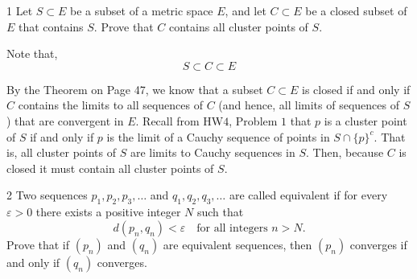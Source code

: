 \documentclass[12pt]{article}
\begin{document}


\begin{problem}{1}
Let $S \subset E$ be a subset of a metric space $E$, and let $C \subset E$ be a closed subset of $E$
that contains $S$. Prove that $C$ contains all cluster points of $S$.
\end{problem}

\begin{solution}
    \bbni

    Note that, 
    \[S \subset C \subset E\]

    By the Theorem on Page 47, we know that a subset $C \subset E$ is closed if and only if $C$ contains the limits to all sequences of $C$ (and hence, all limits of sequences of $S$) that are convergent in $E$. Recall from HW$4$, Problem $1$ that $p$ is a cluster point of $S$ if and only if $p$ is the limit of a Cauchy sequence of points in $S \cap \{p\}^c$. That is, all cluster points of $S$ are limits to Cauchy sequences in $S$. Then, because $C$ is closed it must contain all cluster points of $S$. 
\end{solution}

\newpage

\begin{problem}{2}
Two sequences $p_1, p_2, p_3, \dots$ and $q_1, q_2, q_3, \dots$ are called equivalent if for every
$\varepsilon > 0$ there exists a positive integer $N$ such that
\[
d(p_n, q_n) < \varepsilon \quad \text{for all integers } n > N.
\]
Prove that if $(p_n)$ and $(q_n)$ are equivalent sequences, then $(p_n)$ converges if and only if $(q_n)$ converges.
\end{problem}
\end{document}
